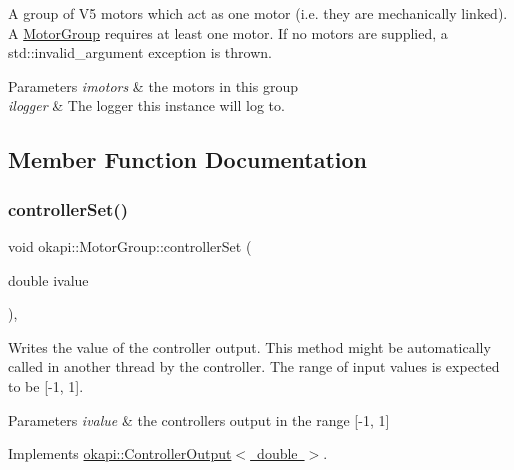 A group of V5 motors which act as one motor (i.\+e. they are mechanically linked). A \mbox{\hyperlink{classokapi_1_1MotorGroup}{Motor\+Group}} requires at least one motor. If no motors are supplied, a std\+::invalid\+\_\+argument exception is thrown.


\begin{DoxyParams}{Parameters}
{\em imotors} & the motors in this group \\
\hline
{\em ilogger} & The logger this instance will log to. \\
\hline
\end{DoxyParams}


\subsection{Member Function Documentation}
\mbox{\label{classokapi_1_1MotorGroup_a9da308795bb956d5f7f3f7885a727d8e}} 
\subsubsection{\texorpdfstring{controllerSet()}{controllerSet()}}
{\footnotesize\ttfamily void okapi\+::\+Motor\+Group\+::controller\+Set (\begin{DoxyParamCaption}\item[{double}]{ivalue }\end{DoxyParamCaption})\hspace{0.3cm}{\ttfamily [override]}, {\ttfamily [virtual]}}

Writes the value of the controller output. This method might be automatically called in another thread by the controller. The range of input values is expected to be \mbox{[}-\/1, 1\mbox{]}.


\begin{DoxyParams}{Parameters}
{\em ivalue} & the controller\textquotesingle{}s output in the range \mbox{[}-\/1, 1\mbox{]} \\
\hline
\end{DoxyParams}


Implements \mbox{\hyperlink{classokapi_1_1ControllerOutput_a360c08f0c10b36f882d6d3100c2cad49}{okapi\+::\+Controller\+Output$<$ double $>$}}.

\mbox{\label{classokapi_1_1MotorGroup_a5cbb95146d4663440632a9e3ccc99ae9}} 
